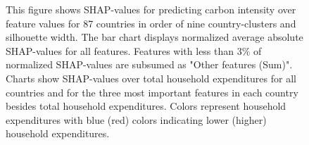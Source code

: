 \begin{figure}[ht!]
    \begin{subcaption2}
     This figure shows SHAP-values for predicting carbon intensity over feature values for 87 countries in order of nine country-clusters and silhouette width. The bar chart displays normalized average absolute SHAP-values for all features. Features with less than 3\% of normalized SHAP-values are subsumed as "Other features (Sum)". Charts show SHAP-values over total household expenditures for all countries and for the three most important features in each country besides total household expenditures. Colors represent household expenditures with blue (red) colors indicating lower (higher) household expenditures.
     \end{subcaption2}
\end{figure}